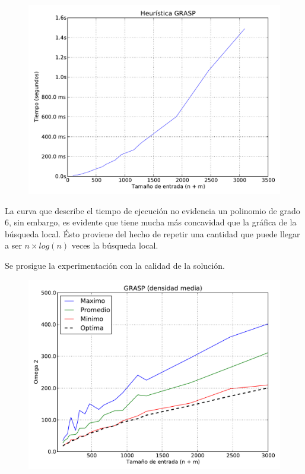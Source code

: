 \begin{figure}[H]
\begin{center}
\includegraphics[angle=0, scale=.75]{imagenes/grasp_2014-06-27_19-18-59.pdf}
\label{grafico local}
\end{center}
\end{figure}

La curva que describe el tiempo de ejecución no evidencia un polinomio de grado 6, sin embargo, es evidente que tiene mucha más concavidad que la gráfica de la búsqueda
local. Ésto proviene  del hecho de repetir una cantidad que puede llegar a ser $n \times log(n)$ veces la búsqueda local.

Se prosigue la experimentación con la calidad de la solución.

\begin{figure}[H]
\begin{center}
\includegraphics[angle=0, scale=.70]{imagenes/calidad_grasp_2014-06-27_08-58-53.pdf}
\label{grafico local}
\end{center}
\end{figure}

